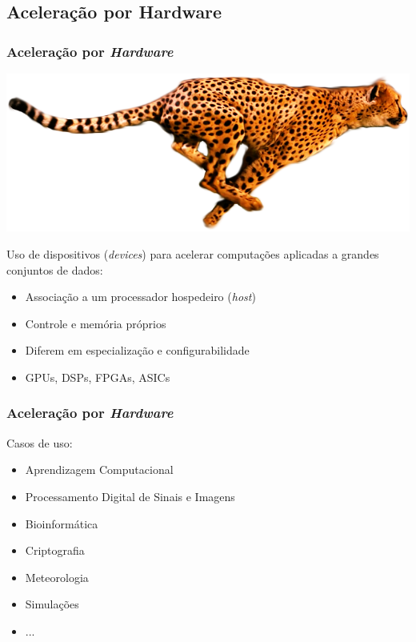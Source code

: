 \documentclass[10pt, compress]{beamer}
\begin{document}
\subsection{Aceleração por Hardware}

\begin{frame}
    \frametitle{Aceleração por \textit{Hardware}}
    \begin{center}
        \includegraphics[width=.6\textwidth]{accelerate}
    \end{center}

    Uso de \alert{dispositivos} (\textit{devices}) para acelerar computações
    aplicadas a grandes conjuntos de dados:
    \pause
    \begin{itemize}
        \item Associação a um processador \alert{hospedeiro} (\textit{host})
            \pause
        \item \alert{Controle} e \alert{memória} próprios
            \pause
        \item Diferem em \alert{especialização} e \alert{configurabilidade}
            \pause
        \item \alert{GPUs}, DSPs, FPGAs, ASICs
    \end{itemize}
\end{frame}

\begin{frame}
    \frametitle{Aceleração por \textit{Hardware}}
    Casos de uso:
    \begin{itemize}
        \item Aprendizagem Computacional
        \item Processamento Digital de Sinais e Imagens
        \item Bioinformática
        \item Criptografia
        \item Meteorologia
        \item Simulações
        \item ...
    \end{itemize}
\end{frame}
\end{document}
